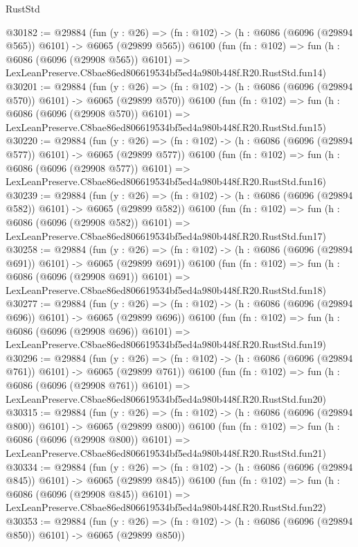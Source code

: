 \begin{lexlean}{RustStd}
\begin{coremodule}
@30182 := @29884
    (fun (y : @26) => (fn : @102) -> (h : @6086 (@6096 (@29894 @565)) @6101) -> @6065 (@29899 @565))
    @6100
    (fun (fn : @102) =>
    fun (h : @6086 (@6096 (@29908 @565)) @6101) =>
    LexLeanPreserve.C8bae86ed806619534bf5ed4a980b448f.R20.RustStd.fun14)
@30201 := @29884
    (fun (y : @26) => (fn : @102) -> (h : @6086 (@6096 (@29894 @570)) @6101) -> @6065 (@29899 @570))
    @6100
    (fun (fn : @102) =>
    fun (h : @6086 (@6096 (@29908 @570)) @6101) =>
    LexLeanPreserve.C8bae86ed806619534bf5ed4a980b448f.R20.RustStd.fun15)
@30220 := @29884
    (fun (y : @26) => (fn : @102) -> (h : @6086 (@6096 (@29894 @577)) @6101) -> @6065 (@29899 @577))
    @6100
    (fun (fn : @102) =>
    fun (h : @6086 (@6096 (@29908 @577)) @6101) =>
    LexLeanPreserve.C8bae86ed806619534bf5ed4a980b448f.R20.RustStd.fun16)
@30239 := @29884
    (fun (y : @26) => (fn : @102) -> (h : @6086 (@6096 (@29894 @582)) @6101) -> @6065 (@29899 @582))
    @6100
    (fun (fn : @102) =>
    fun (h : @6086 (@6096 (@29908 @582)) @6101) =>
    LexLeanPreserve.C8bae86ed806619534bf5ed4a980b448f.R20.RustStd.fun17)
@30258 := @29884
    (fun (y : @26) => (fn : @102) -> (h : @6086 (@6096 (@29894 @691)) @6101) -> @6065 (@29899 @691))
    @6100
    (fun (fn : @102) =>
    fun (h : @6086 (@6096 (@29908 @691)) @6101) =>
    LexLeanPreserve.C8bae86ed806619534bf5ed4a980b448f.R20.RustStd.fun18)
@30277 := @29884
    (fun (y : @26) => (fn : @102) -> (h : @6086 (@6096 (@29894 @696)) @6101) -> @6065 (@29899 @696))
    @6100
    (fun (fn : @102) =>
    fun (h : @6086 (@6096 (@29908 @696)) @6101) =>
    LexLeanPreserve.C8bae86ed806619534bf5ed4a980b448f.R20.RustStd.fun19)
@30296 := @29884
    (fun (y : @26) => (fn : @102) -> (h : @6086 (@6096 (@29894 @761)) @6101) -> @6065 (@29899 @761))
    @6100
    (fun (fn : @102) =>
    fun (h : @6086 (@6096 (@29908 @761)) @6101) =>
    LexLeanPreserve.C8bae86ed806619534bf5ed4a980b448f.R20.RustStd.fun20)
@30315 := @29884
    (fun (y : @26) => (fn : @102) -> (h : @6086 (@6096 (@29894 @800)) @6101) -> @6065 (@29899 @800))
    @6100
    (fun (fn : @102) =>
    fun (h : @6086 (@6096 (@29908 @800)) @6101) =>
    LexLeanPreserve.C8bae86ed806619534bf5ed4a980b448f.R20.RustStd.fun21)
@30334 := @29884
    (fun (y : @26) => (fn : @102) -> (h : @6086 (@6096 (@29894 @845)) @6101) -> @6065 (@29899 @845))
    @6100
    (fun (fn : @102) =>
    fun (h : @6086 (@6096 (@29908 @845)) @6101) =>
    LexLeanPreserve.C8bae86ed806619534bf5ed4a980b448f.R20.RustStd.fun22)
@30353 := @29884
    (fun (y : @26) => (fn : @102) -> (h : @6086 (@6096 (@29894 @850)) @6101) -> @6065 (@29899 @850))

\end{coremodule}
\end{lexlean}
